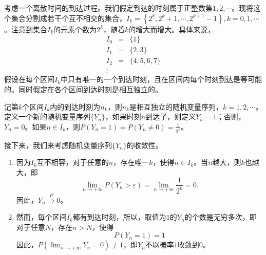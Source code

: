 \begin{example}
    考虑一个离散时间的到达过程。我们假定到达的时刻属于正整数集${1,2,\cdots}$。现将这个集合分割成若干个互不相交的集合，$I_{k}=\left\{2^{k}, 2^{k}+1, \cdots, 2^{k+1}-1\right\},k=0,1,\cdots$。注意到集合$I_k$的元素个数为$2^k$，随着$k$的增大而增大。具体来说，
    \begin{eqnarray*}
        I_0 &=& \{1\}\\
        I_{1}&=&\{2,3\}\\
        I_{2}&=&\{4,5,6,7\}\\
        \vdots
    \end{eqnarray*}
    假设在每个区间$I_k$中只有唯一的一个到达时刻，且在区间内每个时刻到达是等可能的。同时假定在各个区间到达时刻是相互独立的。

    记第$k$个区间$I_k$内的到达时刻为$n_k$，则$n_k$是相互独立的随机变量序列，$k=1,2,\cdots$。定义一个新的随机变量序列$\{Y_n\}$，如果时刻$n$到达了，则定义$Y_n = 1$；否则，$Y_n = 0$。如果$n \in I_k$，则$P(Y_n =1) = P(Y_n \neq 0) = \frac{1}{2^k}$。

    接下来，我们来考虑随机变量序列$\{Y_n\}$的收敛性。
    \begin{enumerate}
        \item 因为$I_k$互不相容，对于任意的$n$，存在唯一$k$，使得$n \in I_k$。当$n$越大，则$k$也越大，即
        $$
        \lim_{n\rightarrow +\infty} P(Y_n > \varepsilon) = \lim_{n\rightarrow +\infty} \frac{1}{2^k} = 0.
        $$
        因此，$Y_{n} \stackrel{P}{\longrightarrow} 0 $。
        \item 然而，每个区间$I_k$都有到达时刻，所以，取值为$1$的$Y_n$的个数是无穷多次，即对于任意$N$，存在$n > N$，使得
        $$
        P(Y_n = 1) = 1
        $$
        因此，$P(\lim_{n \rightarrow +\infty} Y_n = 0) \neq 1$，即$Y_n$不以概率$1$收敛到$0$。
    \end{enumerate}
\end{example}
